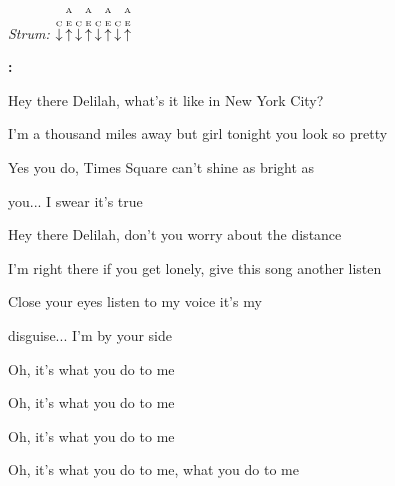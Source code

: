 \begin{song}


\begin{strumbox}
\textit{Strum:} $\PluckDown{C}\PluckUp{A \\ E}\PluckDown{C}\PluckUp{A \\ E}\PluckDown{C}\PluckUp{A \\ E}\PluckDown{C}\PluckUp{A \\ E}$
\end{strumbox}

\begin{chordbox}
\vspace{2em}
\par
{}\par
{}\par
{}\par
{}\par
\end{chordbox}

\bigskip

\Intro\textbf{:}     \par

\bigskip

 Hey there Delilah, what's it like in New York City? \par
I'm a thousand miles away but girl tonight you look so pretty \par
Yes you do,  Times Square can't shine as bright as \par
{}you... I swear it's true \par

\bigskip

 Hey there Delilah, don't you worry about the distance \par
I'm right there if you get lonely, give this song another listen \par
Close your eyes listen to my voice it's my \par
disguise... I'm by your side \par

\bigskip

\begin{chorusbox}{\Chorus}
Oh, it's what you do to me \par
{}Oh, it's what you do to me \par
{}Oh, it's what you do to me \par
{}Oh, it's what you do to me, what you  do to me \par
\end{chorusbox}


\end{song}
